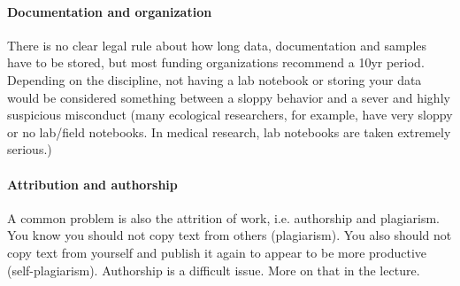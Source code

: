 \documentclass{tufte-book}
\begin{document}
\paragraph{Documentation and organization} There is no clear legal rule about how long data, documentation and samples have to be stored, but most funding organizations recommend a 10yr period. Depending on the discipline, not having a lab notebook or storing your data would be considered something between a sloppy behavior and a sever and highly suspicious misconduct (many ecological researchers, for example, have very sloppy or no lab/field notebooks. In medical research, lab notebooks are taken extremely serious.)

\paragraph{Attribution and authorship} A common problem is also the attrition of work, i.e. authorship and plagiarism. You know you should not copy text from others (plagiarism). You also should not copy text from yourself and publish it again to appear to be more productive (self-plagiarism). Authorship is a difficult issue. More on that in the lecture.




\end{document}
